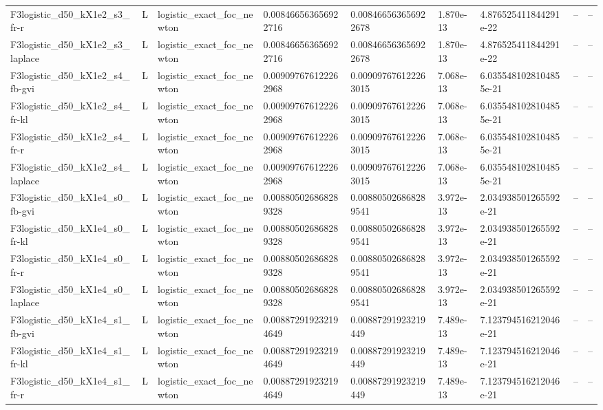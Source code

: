 \begin{tabular}{lllllllll}
F3logistic\_d50\_kX1e2\_s3\_fr-r & L & logistic\_exact\_foc\_newton & 0.008466563656922716 & 0.008466563656922678 & 1.870e-13 & 4.876525411844291e-22 & -- & -- \\
F3logistic\_d50\_kX1e2\_s3\_laplace & L & logistic\_exact\_foc\_newton & 0.008466563656922716 & 0.008466563656922678 & 1.870e-13 & 4.876525411844291e-22 & -- & -- \\
F3logistic\_d50\_kX1e2\_s4\_fb-gvi & L & logistic\_exact\_foc\_newton & 0.009097676122262968 & 0.009097676122263015 & 7.068e-13 & 6.0355481028104855e-21 & -- & -- \\
F3logistic\_d50\_kX1e2\_s4\_fr-kl & L & logistic\_exact\_foc\_newton & 0.009097676122262968 & 0.009097676122263015 & 7.068e-13 & 6.0355481028104855e-21 & -- & -- \\
F3logistic\_d50\_kX1e2\_s4\_fr-r & L & logistic\_exact\_foc\_newton & 0.009097676122262968 & 0.009097676122263015 & 7.068e-13 & 6.0355481028104855e-21 & -- & -- \\
F3logistic\_d50\_kX1e2\_s4\_laplace & L & logistic\_exact\_foc\_newton & 0.009097676122262968 & 0.009097676122263015 & 7.068e-13 & 6.0355481028104855e-21 & -- & -- \\
F3logistic\_d50\_kX1e4\_s0\_fb-gvi & L & logistic\_exact\_foc\_newton & 0.008805026868289328 & 0.008805026868289541 & 3.972e-13 & 2.034938501265592e-21 & -- & -- \\
F3logistic\_d50\_kX1e4\_s0\_fr-kl & L & logistic\_exact\_foc\_newton & 0.008805026868289328 & 0.008805026868289541 & 3.972e-13 & 2.034938501265592e-21 & -- & -- \\
F3logistic\_d50\_kX1e4\_s0\_fr-r & L & logistic\_exact\_foc\_newton & 0.008805026868289328 & 0.008805026868289541 & 3.972e-13 & 2.034938501265592e-21 & -- & -- \\
F3logistic\_d50\_kX1e4\_s0\_laplace & L & logistic\_exact\_foc\_newton & 0.008805026868289328 & 0.008805026868289541 & 3.972e-13 & 2.034938501265592e-21 & -- & -- \\
F3logistic\_d50\_kX1e4\_s1\_fb-gvi & L & logistic\_exact\_foc\_newton & 0.008872919232194649 & 0.00887291923219449 & 7.489e-13 & 7.123794516212046e-21 & -- & -- \\
F3logistic\_d50\_kX1e4\_s1\_fr-kl & L & logistic\_exact\_foc\_newton & 0.008872919232194649 & 0.00887291923219449 & 7.489e-13 & 7.123794516212046e-21 & -- & -- \\
F3logistic\_d50\_kX1e4\_s1\_fr-r & L & logistic\_exact\_foc\_newton & 0.008872919232194649 & 0.00887291923219449 & 7.489e-13 & 7.123794516212046e-21 & -- & -- \\

\end{tabular}
